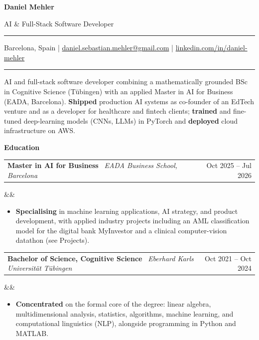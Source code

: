 \documentclass[10pt, a4paper]{article}
\makeatletter
\newcommand{\sectionnobar}[1]{%
  \vspace{10pt}%
  {\large\bfseries\color{headcolor} #1}%
  \vspace{5pt}\par%
}
\newcommand{\cventry}[5]{%
  \noindent
  \begin{tabularx}{\linewidth}{@{}X r@{}}
    {\bfseries #2} \, {\normalsize\textit{#3}} &
    {\small\color{mutedcolor}#1}
  \end{tabularx}%
  \ifx&#4&\else\par\noindent{\small\color{mutedcolor}\faMapMarker*\enspace #4}\fi
  \par #5\vspace{2pt}%
}
\newenvironment{cvlist}{%
  \begin{itemize}[leftmargin=1.2em, label=\textcolor{headcolor}{\small$\bullet$},
    itemsep=1pt, parsep=0pt, topsep=2pt]
}{\end{itemize}}
\makeatother
\begin{document}
\begin{center}
  {\fontsize{26}{28}\selectfont\bfseries\color{headcolor} Daniel Mehler}
  \vspace{6pt}

  {\large\color{mutedcolor} AI \& Full-Stack Software Developer}
  \vspace{8pt}

  \noindent\textcolor{rulecolor}{\rule{\linewidth}{0.8pt}}
  \vspace{6pt}

  {\small
    \faMapMarker*\enspace Barcelona, Spain
    \quad\textcolor{mutedcolor}{|}
    \faEnvelope\enspace \href{mailto:daniel.sebastian.mehler@gmail.com}{daniel.sebastian.mehler@gmail.com}
    \quad\textcolor{mutedcolor}{|}
    \faLinkedin\enspace \href{https://www.linkedin.com/in/daniel-mehler-536630305}{linkedin.com/in/daniel-mehler}
  }
  \vspace{4pt}

  \textcolor{rulecolor}{\rule{\linewidth}{0.8pt}}
\end{center}

\noindent AI and full-stack software developer combining a mathematically grounded BSc in Cognitive Science (T\"ubingen) with an applied Master in AI for Business (EADA, Barcelona). \textbf{Shipped} production AI systems as co-founder of an EdTech venture and as a developer for healthcare and fintech clients; \textbf{trained} and fine-tuned deep-learning models (CNNs, LLMs) in PyTorch and \textbf{deployed} cloud infrastructure on AWS.

\sectionnobar{Education}

\cventry{Oct 2025 -- Jul 2026}
  {Master in AI for Business}
  {EADA Business School, Barcelona}
  {}
  {%
    \begin{cvlist}
      \item \textbf{Specialising} in machine learning applications, AI strategy, and product development, with applied industry projects including an AML classification model for the digital bank MyInvestor and a clinical computer-vision datathon (see Projects).
    \end{cvlist}
  }

\cventry{Oct 2021 -- Oct 2024}
  {Bachelor of Science, Cognitive Science}
  {Eberhard Karls Universit\"at T\"ubingen}
  {}
  {%
    \begin{cvlist}
      \item \textbf{Concentrated} on the formal core of the degree: linear algebra, multidimensional analysis, statistics, algorithms, machine learning, and computational linguistics (NLP), alongside programming in Python and MATLAB.
    \end{cvlist}
  }
\end{document}
